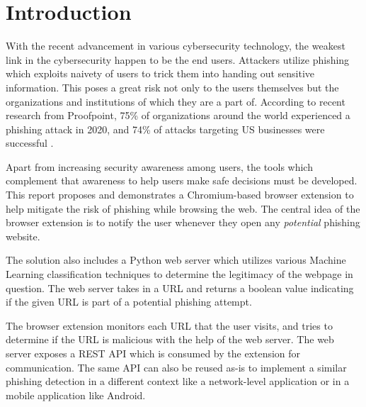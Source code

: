 \documentclass[conference]{IEEEtran}
\begin{document}
\section{Introduction}

With the recent advancement in various cybersecurity technology, the weakest link in the cybersecurity happen to be the end users.
Attackers utilize phishing which exploits naivety of users to trick them into handing out sensitive information.
This poses a great risk not only to the users themselves but the organizations and institutions of which they are a part of.
According to recent research from Proofpoint, 75\% of organizations around the world experienced a phishing attack in 2020, and 74\% of attacks targeting US businesses were successful \cite{stateofphishing}.

\par Apart from increasing security awareness among users, the tools which complement that awareness to help users make safe decisions must be developed.
This report proposes and demonstrates a Chromium-based browser extension to help mitigate the risk of phishing while browsing the web.
The central idea of the browser extension is to notify the user whenever they open any \emph{potential} phishing website.

\par The solution also includes a Python web server which utilizes various Machine Learning classification techniques to determine the legitimacy of the webpage in question.
The web server takes in a URL and returns a boolean value indicating if the given URL is part of a potential phishing attempt.

\par The browser extension monitors each URL that the user visits, and tries to determine if the URL is malicious with the help of the web server.
The web server exposes a REST API which is consumed by the extension for communication.
The same API can also be reused as-is to implement a similar phishing detection in a different context like a network-level application or in a mobile application like Android.
\end{document}
